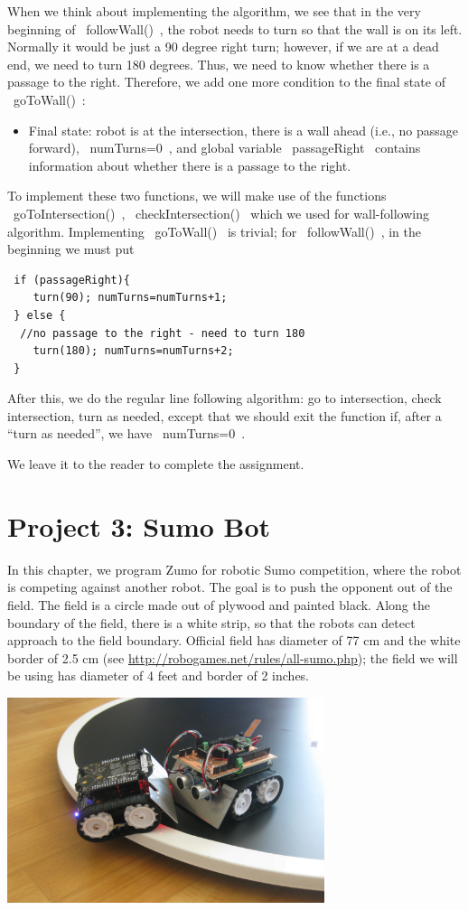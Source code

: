\documentclass[oneside]{stml-l}
\numberwithin{figure}{chapter}
\begin{document}
When we think about implementing the algorithm, we see that in the 
very beginning of ~followWall()~, the robot needs to turn so that the wall 
is on its left. Normally it would be just a 90 degree right  turn; however, 
if we are at a dead end, we need to turn 180 degrees. Thus, we need to know 
whether there is  a passage to the right. Therefore, we add one more 
condition to the final state of ~goToWall()~:
\begin{itemize}
\item Final state: robot is at the intersection, there is a wall ahead 
(i.e., no passage forward),  ~numTurns=0~, and global variable 
~passageRight~ contains information about whether there is a passage to the right. 
 \end{itemize}
 
 To implement these two functions, we will make use of the functions 
 ~goToIntersection()~, ~checkIntersection()~ which we used for 
 wall-following algorithm. Implementing ~goToWall()~ is trivial; for 
 ~followWall()~, in the beginning we must put 
 \begin{lstlisting}
 if (passageRight){
    turn(90); numTurns=numTurns+1;
 } else {
  //no passage to the right - need to turn 180
    turn(180); numTurns=numTurns+2;
 }
 \end{lstlisting}
 
 After this, we do the regular line following algorithm: go to intersection,
  check intersection, turn as needed, except that we should exit the 
  function if, after a ``turn as needed'', we have  ~numTurns=0~.
 
 We leave it to the reader to complete the assignment. 
 
    
\chapter{Project 3: Sumo Bot}
In this chapter, we program Zumo for robotic Sumo competition, where 
the  robot is competing against another robot. The goal is to push the 
opponent out of the field. The field is a circle   made out of plywood 
and painted black. Along the boundary of the field, 
there is a white strip, so that the robots can detect 
approach to the field boundary. Official field has diameter of 77 cm 
and the white border of 2.5 cm (see \url{http://robogames.net/rules/all-sumo.php}); 
the field we will be using has diameter of 4 feet and border of 2 inches. 


\includegraphics[height=6cm]{figures/sumo-robot-fight.png}
\end{document}
